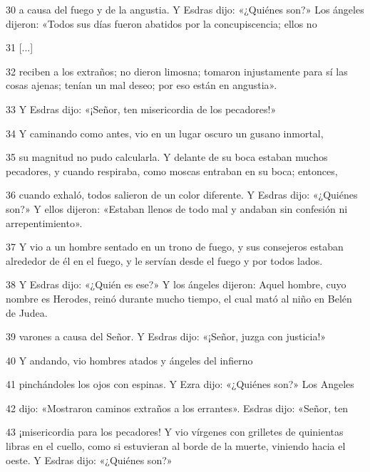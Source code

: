 \par 30 a causa del fuego y de la angustia. Y Esdras dijo: «¿Quiénes son?» Los ángeles dijeron: «Todos sus días fueron abatidos por la concupiscencia; ellos no

\par 31 [...]

\par 32 reciben a los extraños; no dieron limosna; tomaron injustamente para sí las cosas ajenas; tenían un mal deseo; por eso están en angustia».

\par 33 Y Esdras dijo: «¡Señor, ten misericordia de los pecadores!»

\par 34 Y caminando como antes, vio en un lugar oscuro un gusano inmortal,

\par 35 su magnitud no pudo calcularla. Y delante de su boca estaban muchos pecadores, y cuando respiraba, como moscas entraban en su boca; entonces,

\par 36 cuando exhaló, todos salieron de un color diferente. Y Esdras dijo: «¿Quiénes son?» Y ellos dijeron: «Estaban llenos de todo mal y andaban sin confesión ni arrepentimiento».

\par 37 Y vio a un hombre sentado en un trono de fuego, y sus consejeros estaban alrededor de él en el fuego, y le servían desde el fuego y por todos lados.

\par 38 Y Esdras dijo: «¿Quién es ese?» Y los ángeles dijeron: Aquel hombre, cuyo nombre es Herodes, reinó durante mucho tiempo, el cual mató al niño en Belén de Judea.

\par 39 varones a causa del Señor. Y Esdras dijo: «¡Señor, juzga con justicia!»

\par 40 Y andando, vio hombres atados y ángeles del infierno

\par 41 pinchándoles los ojos con espinas. Y Ezra dijo: «¿Quiénes son?» Los Angeles

\par 42 dijo: «Mostraron caminos extraños a los errantes». Esdras dijo: «Señor, ten

\par 43 ¡misericordia para los pecadores! Y vio vírgenes con grilletes de quinientas libras en el cuello, como si estuvieran al borde de la muerte, viniendo hacia el oeste. Y Esdras dijo: «¿Quiénes son?»

